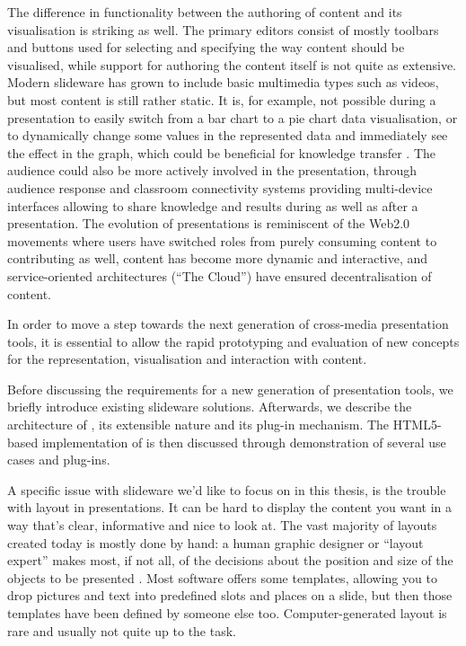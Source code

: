    The difference in functionality between the authoring of content and its
   visualisation is striking as well. The primary editors consist of mostly
   toolbars and buttons used for selecting and specifying the way content
   should be visualised, while support for authoring the content itself is not
   quite as extensive. Modern slideware has grown to include basic multimedia
   types such as videos, but most content is still rather static. It is, for
   example, not possible during a presentation to easily switch from a bar
   chart to a pie chart data visualisation, or to dynamically change some
   values in the represented data and immediately see the effect in the graph,
   which could be beneficial for knowledge transfer \citep{holzinger-1}. The
   audience could also be more actively involved in the presentation, through
   audience response and classroom connectivity systems providing multi-device
   interfaces allowing to share knowledge and results during as well as after a
   presentation. The evolution of presentations is reminiscent of the Web2.0
   movements where users have switched roles from purely consuming content to
   contributing as well, content has become more dynamic and interactive, and
   service-oriented architectures (``The Cloud'') have ensured decentralisation
   of content.

   In order to move a step towards the next generation of cross-media
   presentation tools, it is essential to allow the rapid prototyping and
   evaluation of new concepts for the representation, visualisation and
   interaction with content.
   
   Before discussing the requirements for a new generation of presentation
   tools, we briefly introduce existing slideware solutions. Afterwards, we
   describe the architecture of \mxp, its extensible nature and its plug-in
   mechanism. The HTML5-based implementation of \mxp is then discussed through
   demonstration of several use cases and \mxp plug-ins.

   A specific issue with slideware we'd like to focus on in this thesis, is the
   trouble with layout in presentations. It can be hard to display the content
   you want in a way that's clear, informative and nice to look at. The vast
   majority of layouts created today is mostly done by hand: a human graphic
   designer or ``layout expert'' makes most, if not all, of the decisions about
   the position and size of the objects to be presented \citep{lok-1}. Most
   software offers some templates, allowing you to drop pictures and text into
   predefined slots and places on a slide, but then those templates have been
   defined by someone else too. Computer-generated layout is rare and usually
   not quite up to the task.
  
